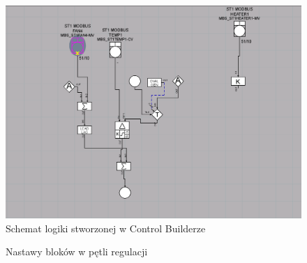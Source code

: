 \documentclass[12pt, a4paper]{article}
\begin{document}
\begin{figure}[H]
	\centering
	\includegraphics[width=0.9\linewidth]{schemat}
	\caption{Schemat logiki stworzonej w Control Builderze}
	\label{fig:schemat}
\end{figure}

	\begin{figure}[H]
		\centering
		\qquad
		\caption{Nastawy bloków w pętli regulacji}%
		\label{fig:12}%
	\end{figure}
\end{document}
